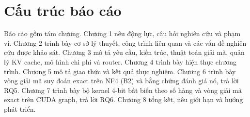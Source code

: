 \section{Cấu trúc báo cáo}
Báo cáo gồm tám chương. Chương 1 nêu động lực, câu hỏi nghiên cứu và phạm vi. Chương 2 trình bày cơ sở lý thuyết, công trình liên quan và các vấn đề nghiên cứu được khảo sát. Chương 3 mô tả yêu cầu, kiến trúc, thuật toán giải mã, quản lý KV cache, mô hình chi phí và router. Chương 4 trình bày hiện thực chương trình. Chương 5 mô tả giao thức và kết quả thực nghiệm. Chương 6 trình bày vòng giải mã suy đoán exact trên NF4 (B2) và bằng chứng đánh giá nó, trả lời RQ5. Chương 7 trình bày bộ kernel 4-bit bất biến theo số hàng và vòng giải mã exact trên CUDA graph, trả lời RQ6. Chương 8 tổng kết, nêu giới hạn và hướng phát triển.
